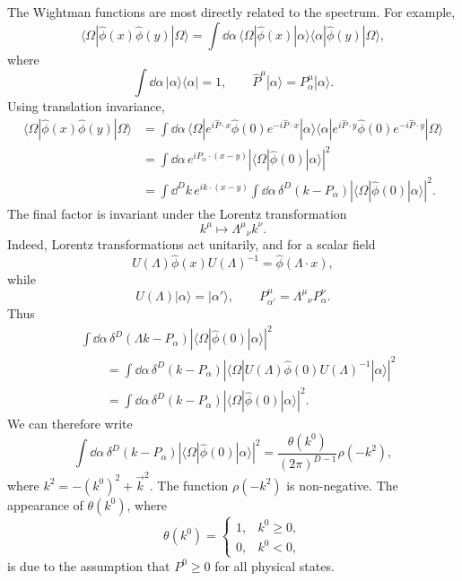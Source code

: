 The Wightman functions are most directly related to the spectrum. For example,
\[
  \langle\Omega|\hat\phi(x)\hat\phi(y)|\Omega\rangle
  =
  \int \dd\alpha\,
  \langle\Omega|\hat\phi(x)|\alpha\rangle
  \langle\alpha|\hat\phi(y)|\Omega\rangle,
\]
where
\[
  \int \dd\alpha\,|\alpha\rangle\langle\alpha|=1,
  \qquad
  \hat P^\mu|\alpha\rangle=P_\alpha^\mu|\alpha\rangle.
\]
Using translation invariance,
\[
\begin{aligned}
  \langle\Omega|\hat\phi(x)\hat\phi(y)|\Omega\rangle
  &=
  \int \dd\alpha\,
  \langle\Omega|
  e^{i\hat P\cdot x}\hat\phi(0)e^{-i\hat P\cdot x}
  |\alpha\rangle
  \langle\alpha|
  e^{i\hat P\cdot y}\hat\phi(0)e^{-i\hat P\cdot y}
  |\Omega\rangle  \\
  &=
  \int \dd\alpha\,
  e^{iP_\alpha\cdot(x-y)}
  \left|\langle\Omega|\hat\phi(0)|\alpha\rangle\right|^2  \\
  &=
  \int \dd^D k\, e^{ik\cdot(x-y)}
  \int \dd\alpha\,\delta^D(k-P_\alpha)
  \left|\langle\Omega|\hat\phi(0)|\alpha\rangle\right|^2 .
\end{aligned}
\]
The final factor is invariant under the Lorentz transformation
\[
  k^\mu\mapsto \Lambda^\mu{}_\nu k^\nu .
\]
Indeed, Lorentz transformations act unitarily, and for a scalar field
\[
  U(\Lambda)\hat\phi(x)U(\Lambda)^{-1}
  =
  \hat\phi(\Lambda\cdot x),
\]
while
\[
  U(\Lambda)|\alpha\rangle=|\alpha'\rangle,
  \qquad
  P_{\alpha'}^\mu=\Lambda^\mu{}_\nu P_\alpha^\nu .
\]
Thus
\[
\begin{aligned}
  &\int \dd\alpha\,
  \delta^D(\Lambda k-P_\alpha)
  \left|\langle\Omega|\hat\phi(0)|\alpha\rangle\right|^2  \\
  &\qquad =
  \int \dd\alpha\,
  \delta^D(k-P_\alpha)
  \left|
    \langle\Omega|
    U(\Lambda)\hat\phi(0)U(\Lambda)^{-1}
    |\alpha\rangle
  \right|^2  \\
  &\qquad =
  \int \dd\alpha\,
  \delta^D(k-P_\alpha)
  \left|\langle\Omega|\hat\phi(0)|\alpha\rangle\right|^2 .
\end{aligned}
\]
We can therefore write
\[
  \int \dd\alpha\,
  \delta^D(k-P_\alpha)
  \left|\langle\Omega|\hat\phi(0)|\alpha\rangle\right|^2
  =
  \frac{\theta(k^0)}{(2\pi)^{D-1}}\rho(-k^2),
\]
where \(k^2=-(k^0)^2+\vec k^2\). The function
\(\rho(-k^2)\) is non-negative. The appearance of \(\theta(k^0)\),
where
\[
  \theta(k^0)=
  \begin{cases}
    1, & k^0\ge 0,\\
    0, & k^0<0,
  \end{cases}
\]
is due to the assumption that \(P^0\ge 0\) for all physical states.
